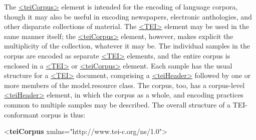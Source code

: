 The \hyperref[TEI.teiCorpus]{<teiCorpus>} element is intended for the encoding of language corpora, though it may also be useful in encoding newspapers, electronic anthologies, and other disparate collections of material. The \hyperref[TEI.TEI]{<TEI>} element may be used in the same manner itself; the \hyperref[TEI.teiCorpus]{<teiCorpus>} element, however, makes explicit the multiplicity of the collection, whatever it may be. The individual samples in the corpus are encoded as separate \hyperref[TEI.TEI]{<TEI>} elements, and the entire corpus is enclosed in a \hyperref[TEI.TEI]{<TEI>} or \hyperref[TEI.teiCorpus]{<teiCorpus>} element. Each sample has the usual structure for a \hyperref[TEI.TEI]{<TEI>} document, comprising a \hyperref[TEI.teiHeader]{<teiHeader>} followed by one or more members of the \textsf{model.resource} class. The corpus, too, has a corpus-level \hyperref[TEI.teiHeader]{<teiHeader>} element, in which the corpus as a whole, and encoding practices common to multiple samples may be described. The overall structure of a TEI-conformant corpus is thus: \par\bgroup{}\exampleFont \begin{shaded}\noindent\mbox{}{<\textbf{teiCorpus} xmlns="http://www.tei-c.org/ns/1.0">}\mbox{}\newline 
{}\mbox{}\newline 
{}\mbox{}\newline 
\hspace*{1em}\mbox{}\newline 
\hspace*{1em}\mbox{}\newline 
{}\mbox{}\newline 
{}\mbox{}\newline 
\hspace*{1em}\mbox{}\newline 

\end{shaded}
